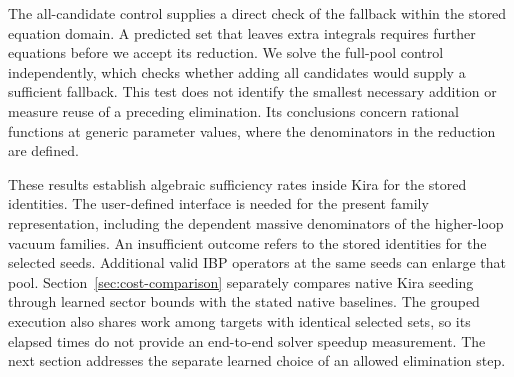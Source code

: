 The all-candidate control supplies a direct check of the fallback
within the stored equation domain. A predicted set that leaves
extra integrals requires further equations before we accept its
reduction. We solve the full-pool control independently, which checks whether
adding all candidates would supply a sufficient fallback. This test
does not identify the smallest necessary addition or measure reuse
of a preceding elimination.
Its conclusions concern rational functions at generic parameter
values, where the denominators in the reduction are defined.

These results establish algebraic sufficiency rates inside Kira
for the stored identities. The user-defined interface is needed
for the present family representation, including the dependent
massive denominators of the higher-loop vacuum families.
An insufficient outcome refers to the stored identities for the
selected seeds. Additional valid IBP operators at the same seeds can
enlarge that pool. Section~\ref{sec:cost-comparison} separately compares native Kira
seeding through learned sector bounds with the stated native baselines. The grouped
execution also shares work among targets with identical selected
sets, so its elapsed times do not provide an end-to-end solver
speedup measurement. The next section addresses the separate
learned choice of an allowed elimination step.
